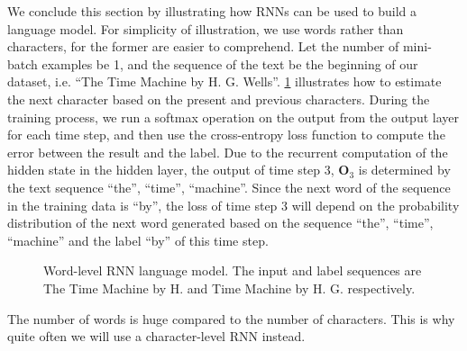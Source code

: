 We conclude this section by illustrating how RNNs can be used to build a language model. For simplicity of illustration, we use words rather than characters, for the former are easier to comprehend. Let the number of mini-batch examples be 1, and the sequence of the text be the beginning of our dataset, i.e. “The Time Machine by H. G. Wells”. \cref{fig:rnn-train} illustrates how to estimate the next character based on the present and previous characters. During the training process, we run a softmax operation on the output from the output layer for each time step, and then use the cross-entropy loss function to compute the error between the result and the label. Due to the recurrent computation of the hidden state in the hidden layer, the output of time step 3, $\mathbf{O}_3$ is determined by the text sequence “the”, “time”, “machine”. Since the next word of the sequence in the training data is “by”, the loss of time step 3 will depend on the probability distribution of the next word generated based on the sequence “the”, “time”, “machine” and the label “by” of this time step.

\begin{figure}[hpt]
    \centering
    
    \caption{Word-level RNN language model. The input and label sequences are The Time Machine by H. and Time Machine by H. G. respectively.}
    \label{fig:rnn-train}
\end{figure}


The number of words is huge compared to the number of characters. This is why quite often we will use a character-level RNN instead.



%     

